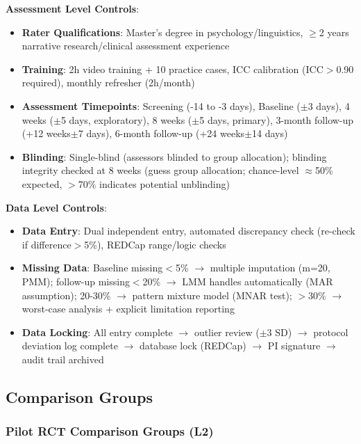 \documentclass[11pt]{article}
\begin{document}
\textbf{Assessment Level Controls}:
\begin{itemize}
    \item \textbf{Rater Qualifications}: Master's degree in psychology/linguistics, $\ge$2 years narrative research/clinical assessment experience
    \item \textbf{Training}: 2h video training + 10 practice cases, ICC calibration (ICC$>$0.90 required), monthly refresher (2h/month)
    \item \textbf{Assessment Timepoints}: Screening (-14 to -3 days), Baseline ($\pm$3 days), 4 weeks ($\pm$5 days, exploratory), 8 weeks ($\pm$5 days, primary), 3-month follow-up (+12 weeks$\pm$7 days), 6-month follow-up (+24 weeks$\pm$14 days)
    \item \textbf{Blinding}: Single-blind (assessors blinded to group allocation); blinding integrity checked at 8 weeks (guess group allocation; chance-level $\approx$50\% expected, $>$70\% indicates potential unblinding)
\end{itemize}

\textbf{Data Level Controls}:
\begin{itemize}
    \item \textbf{Data Entry}: Dual independent entry, automated discrepancy check (re-check if difference$>$5\%), REDCap range/logic checks
    \item \textbf{Missing Data}: Baseline missing$<$5\% $\rightarrow$ multiple imputation (m=20, PMM); follow-up missing$<$20\% $\rightarrow$ LMM handles automatically (MAR assumption); 20-30\% $\rightarrow$ pattern mixture model (MNAR test); $>$30\% $\rightarrow$ worst-case analysis + explicit limitation reporting
    \item \textbf{Data Locking}: All entry complete $\rightarrow$ outlier review ($\pm$3 SD) $\rightarrow$ protocol deviation log complete $\rightarrow$ database lock (REDCap) $\rightarrow$ PI signature $\rightarrow$ audit trail archived
\end{itemize}

\subsection{Comparison Groups}

\subsubsection{Pilot RCT Comparison Groups (L2)}
\end{document}
